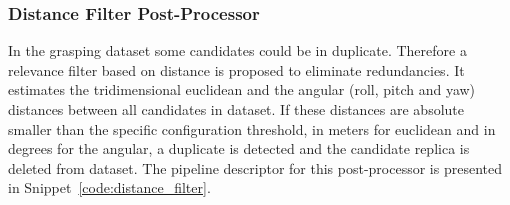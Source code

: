 
\subsubsection{Distance Filter Post-Processor}
\label{cap4:modular_grasping_architecture:sec:grasping_synthesis:subsec:postprocessor:subsubsec:distance_filter}

In the grasping dataset some candidates could be in duplicate. Therefore a relevance filter based on distance is proposed to eliminate redundancies. It estimates the tridimensional euclidean and the angular (roll, pitch and yaw) distances between all candidates in dataset. If these distances are absolute smaller than the specific configuration threshold, in meters for euclidean and in degrees for the angular, a duplicate is detected and the candidate replica is deleted from dataset. The pipeline descriptor for this post-processor is presented in Snippet~\ref{code:distance_filter}.%

\begin{snippet}[h!]
\centering
{}
\end{snippet}


